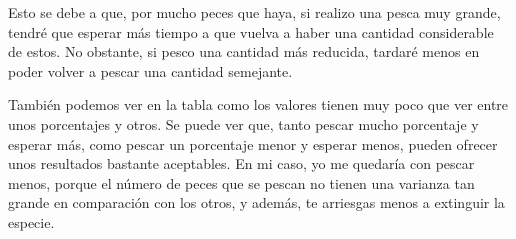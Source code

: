 \documentclass[11pt,a4paper]{report}
\begin{document}
Esto se debe a que, por mucho peces que haya, si realizo una pesca muy grande, tendré que esperar más tiempo a que vuelva a haber una
cantidad considerable de estos. No obstante, si pesco una cantidad más reducida, tardaré menos en poder volver a pescar una cantidad semejante.

También podemos ver en la tabla como los valores tienen muy poco que ver entre unos porcentajes y otros. Se puede ver que, tanto pescar mucho
porcentaje y esperar más, como pescar un porcentaje menor y esperar menos, pueden ofrecer unos resultados bastante aceptables. En mi caso,
yo me quedaría con pescar menos, porque el número de peces que se pescan no tienen una varianza tan grande en comparación con los otros, y
además, te arriesgas menos a extinguir la especie. 
\end{document}
